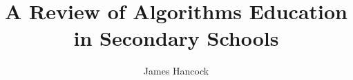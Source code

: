 \documentclass[11pt]{IEEEtran}
\title{A Review of Algorithms Education in Secondary Schools}
\author{James Hancock}
\begin{document}
\maketitle







\balance{}
\printbibliography{}
\end{document}
